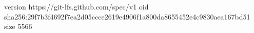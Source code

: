 version https://git-lfs.github.com/spec/v1
oid sha256:29f7b3f4692f7ea2d05ccce2619e4906f1a800da8655452e4c9830aea167bd51
size 5566
